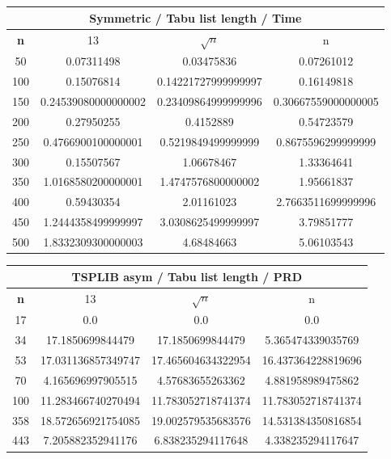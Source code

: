 \documentclass{article}
\begin{document}
\begin{center}
\begin{tabular}{|c|c|c|c|}
\hline
\multicolumn{4}{|c|}{\textbf{Symmetric / Tabu list length / Time}}\\
\hline
\textbf{n} & 13 & $\sqrt{n}$ & n\\
\hline
50 & 0.07311498 & 0.03475836 & 0.07261012\\
\hline
100 & 0.15076814 & 0.14221727999999997 & 0.16149818\\
\hline
150 & 0.24539080000000002 & 0.23409864999999996 & 0.30667559000000005\\
\hline
200 & 0.27950255 & 0.4152889 & 0.54723579\\
\hline
250 & 0.4766900100000001 & 0.5219849499999999 & 0.8675596299999999\\
\hline
300 & 0.15507567 & 1.06678467 & 1.33364641\\
\hline
350 & 1.0168580200000001 & 1.4747576800000002 & 1.95661837\\
\hline
400 & 0.59430354 & 2.01161023 & 2.7663511699999996\\
\hline
450 & 1.2444358499999997 & 3.0308625499999997 & 3.79851777\\
\hline
500 & 1.8332309300000003 & 4.68484663 & 5.06103543\\
\hline
\end{tabular}
\end{center}


\begin{center}
\begin{tabular}{|c|c|c|c|}
\hline
\multicolumn{4}{|c|}{\textbf{TSPLIB asym / Tabu list length / PRD}}\\
\hline
\textbf{n} & 13 & $\sqrt{n}$ & n\\
\hline
17 & 0.0 & 0.0 & 0.0\\
\hline
34 & 17.1850699844479 & 17.1850699844479 & 5.365474339035769\\
\hline
53 & 17.031136857349747 & 17.465604634322954 & 16.437364228819696\\
\hline
70 & 4.165696997905515 & 4.57683655263362 & 4.881958989475862\\
\hline
100 & 11.283466740270494 & 11.783052718741374 & 11.783052718741374\\
\hline
358 & 18.572656921754085 & 19.002579535683576 & 14.531384350816854\\
\hline
443 & 7.205882352941176 & 6.838235294117648 & 4.338235294117647\\
\hline
\end{tabular}
\end{center}
\end{document}
